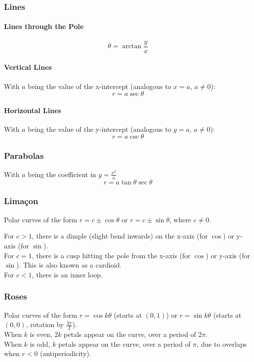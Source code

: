 \documentclass{article}
\begin{document}
\subsubsection{Lines}
\paragraph{Lines through the Pole}
$$\theta = \arctan{\frac{y}{x}}$$

\paragraph{Vertical Lines}
With $a$ being the value of the x-intercept (analogous to $x=a$, $a\ne0$):
$$r = a \sec{\theta}$$

\paragraph{Horizontal Lines}
With $a$ being the value of the y-intercept (analogous to $y=a$, $a\ne0$):
$$r = a \csc{\theta}$$

\subsubsection{Parabolas}
With $a$ being the coefficient in $y = \frac{x^2}{a}$
$$r = a\tan{\theta}\sec{\theta}$$

\subsubsection{Limaçon}
Polar curves of the form $r = c \pm \cos{\theta}$ or $r = c \pm \sin{\theta}$, where $c \ne 0$.

For $c > 1$, there is a dimple (slight bend inwards) on the x-axis (for $\cos$) or y-axis (for $\sin$).\\
For $c = 1$, there is a cusp hitting the pole from the x-axis (for $\cos$) or y-axis (for $\sin$). This is also known as a cardioid.\\
For $c < 1$, there is an inner loop.

\subsubsection{Roses}
Polar curves of the form $r=\cos{k\theta}$ (starts at $(0, 1)$) or $r=\sin{k\theta}$ (starts at $(0, 0)$, rotation by $\frac{3\pi}{2}$).\\
When $k$ is even, $2k$ petals appear on the curve, over a period of $2\pi$.\\
When $k$ is odd, $k$ petals appear on the curve, over a period of $\pi$, due to overlaps when $r < 0$ (antiperiodicity).
\end{document}
